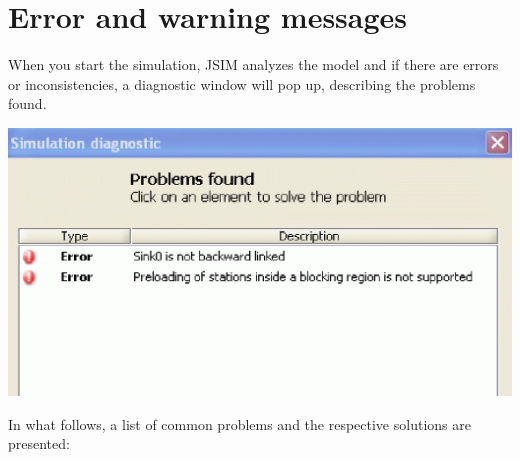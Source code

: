 \section{Error and warning messages}
\label{sec:ErrorAndWarningMessages} When you start the simulation,
JSIM analyzes the model and if there are errors or
inconsistencies, a diagnostic window will pop up, describing the
problems found.
\begin{center}
\includegraphics[scale=.5]{img/jsim/error_window.eps}
\end{center}
In what follows, a list of common problems and the respective solutions are presented:
